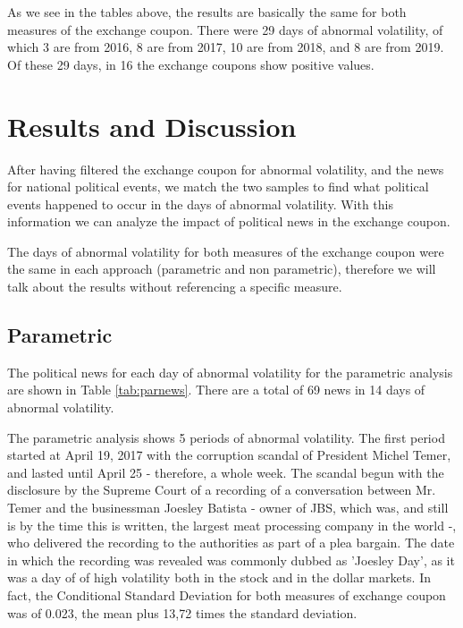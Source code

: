 \documentclass[cic,tc, english]{iiufrgs}
\begin{document}
    

    

    As we see in the tables above, the results are basically the same for both measures of the exchange coupon. There were 29 days of abnormal volatility, of which 3 are from 2016, 8 are from 2017, 10 are from 2018, and 8 are from 2019. Of these 29 days, in 16 the exchange coupons show positive values.

\chapter{Results and Discussion} \label{chapter_results_discussion}

    After having filtered the exchange coupon for abnormal volatility, and the news for national political events, we match the two samples to find what political events happened to occur in the days of abnormal volatility. With this information we can analyze the impact of political news in the exchange coupon.

    The days of abnormal volatility for both measures of the exchange coupon were the same in each approach (parametric and non parametric), therefore we will talk about the results without referencing a specific measure.

\section{Parametric}

    The political news for each day of abnormal volatility for the parametric analysis are shown in Table \ref{tab:parnews}. There are a total of 69 news in 14 days of abnormal volatility.

    

    The parametric analysis shows 5 periods of abnormal volatility. The first period started at April 19, 2017 with the corruption scandal of President Michel Temer, and lasted until April 25 - therefore, a whole week. The scandal begun with the disclosure by the Supreme Court of a recording of a conversation between Mr. Temer and the businessman Joesley Batista - owner of JBS, which was, and still is by the time this is written, the largest meat processing company in the world -, who delivered the recording to the authorities as part of a plea bargain. The date in which the recording was revealed was commonly dubbed as 'Joesley Day', as it was a day of of high volatility both in the stock and in the dollar markets. In fact, the Conditional Standard Deviation for both measures of exchange coupon was of 0.023, the mean plus 13,72 times the standard deviation.
\end{document}
